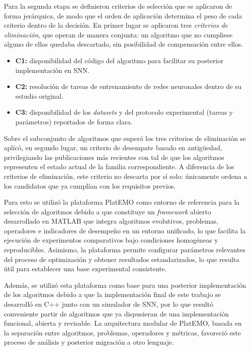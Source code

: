 Para la segunda etapa se definieron criterios de selección que se aplicaron de forma jerárquica, de modo que el orden de aplicación determina el peso de cada criterio dentro de la decisión. En primer lugar se aplicaron tres \textit{criterios de eliminación}, que operan de manera conjunta: un algoritmo que no cumpliese alguno de ellos quedaba descartado, sin posibilidad de compensación entre ellos.

\begin{itemize}
    \item \textbf{C1:} disponibilidad del código del algoritmo para facilitar su posterior implementación en SNN.
    \item \textbf{C2:} resolución de tareas de entrenamiento de redes neuronales dentro de su estudio original.
    \item \textbf{C3:} disponibilidad de los \textit{datasets} y del protocolo experimental (tareas y parámetros) reportados de forma clara.
\end{itemize}

Sobre el subconjunto de algoritmos que superó los tres criterios de eliminación se aplicó, en segundo lugar, un criterio de desempate basado en antigüedad, privilegiando las publicaciones más recientes con tal de que los algoritmos representen el estado actual de la familia correspondiente. A diferencia de los criterios de eliminación, este criterio no descarta por sí solo: únicamente ordena a los candidatos que ya cumplían con los requisitos previos.

Para esto se utilizó la plataforma PlatEMO \cite{8065138_platEMO} como entorno de referencia para la selección de algoritmos debido a que constituye un \textit{framework} abierto desarrollado en MATLAB que integra algoritmos evolutivos, problemas, operadores e indicadores de desempeño en un entorno unificado, lo que facilita la ejecución de experimentos comparativos bajo condiciones homogéneas y reproducibles. Asimismo, la plataforma permite configurar parámetros relevantes del proceso de optimización y obtener resultados estandarizados, lo que resulta útil para establecer una base experimental consistente.

Además, se utilizó esta plataforma como base para una posterior implementación de los algoritmos debido a que la implementación final de este trabajo se desarrolló en C++ junto con un simulador de SNN, por lo que resultó conveniente partir de algoritmos que ya dispusieran de una implementación funcional, abierta y revisable. La arquitectura modular de PlatEMO, basada en la separación entre algoritmos, problemas, operadores y métricas, favoreció este proceso de análisis y posterior migración a otro lenguaje.

